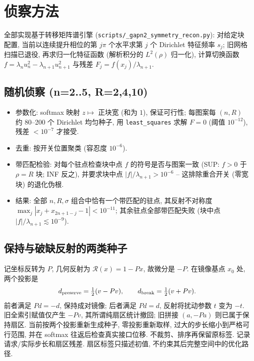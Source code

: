 \documentclass[UTF8]{ctexart}
\begin{document}
\section{侦察方法}\label{sec:methods}

全部实现基于转移矩阵谱引擎 (\texttt{scripts/\_gapn2\_symmetry\_recon.py}):
对给定块配置, 当前以连续提升相位的第 $j\pi$ 个水平求第 $j$ 个 Dirichlet 特征频率 $s_j$; 旧网格扫描已退役,
再求归一化特征函数 (解析积分的 $L^2(\rho)$ 归一化), 计算切换函数
$f=\lambda_nu_n^2-\lambda_{n+1}u_{n+1}^2$ 与残差 $F_j=f(x_j)/\lambda_{n+1}$.

\subsection{随机侦察 (n=2..5, R=2,4,10)}

\begin{itemize}
	\item 参数化: softmax 映射 $z\mapsto$ 正块宽 (和为 $1$), 保证可行性;
	每图案每 $(n,R)$ 约 80--200 个 Dirichlet 均匀种子, 用
	\texttt{least\_squares} 求解 $F=0$ (阈值 $10^{-12}$), 残差 $<10^{-7}$
	才接受.
	\item 去重: 按开关位置聚类 (容忍度 $10^{-6}$).
	\item 带匹配检验: 对每个驻点检查块中点 $f$ 的符号是否与图案一致
	(SUP: $f>0$ 于 $\rho=R$ 块; INF 反之), 并要求块中点
	$|f|/\lambda_{n+1}>10^{-6}$ -- 这排除重合开关 (零宽块) 的退化伪根.
	\item 结果: 全部 $n,R,\sigma$ 组合中恰有一个带匹配的驻点, 其反射不对称度
	$\max_j|x_j+x_{2n+1-j}-1|<10^{-11}$; 其余驻点全部带匹配失败
	(块中点 $|f|/\lambda_{n+1}\lesssim10^{-9}$).
\end{itemize}

\subsection{保持与破缺反射的两类种子}

记坐标反转为 $P$, 几何反射为 $\mathcal R(x)=1-Px$, 故微分是 $-P$.
在镜像基点 $x_0$ 处, 两个投影是
\[
 d_{\rm preserve}=\tfrac12(v-Pv),\qquad
 d_{\rm break}=\tfrac12(v+Pv).
\]
前者满足 $Pd=-d$, 保持成对镜像; 后者满足 $Pd=d$, 反射将扰动参数 $t$ 变为 $-t$.
旧全索引赋值仅产生 $-Pv$, 其所谓纯扇区统计撤回; 旧拼接 $(a,-Pa)$ 则已属于保持扇区.
当前按两个投影重新生成种子, 零投影重新取样, 过大的步长缩小到严格可行范围,
并在 softmax 往返后检查真实接口位移. 不裁剪、排序再保留原标签.
记录请求/实际步长和扇区残差. 扇区标签只描述初值, 不约束其后完整空间中的优化路径.
\end{document}
